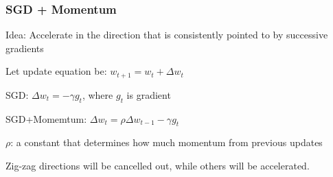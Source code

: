 \begin{frame}
\frametitle{SGD + Momentum}
\bi
\item Idea: Accelerate in the direction that is consistently pointed to by successive gradients
\pause
\item Let update equation be: $w_{t+1} = w_t + \Delta w_t$
	\bi
	\item SGD: $\Delta w_t = -\gamma g_t$, where $g_t$ is gradient
	\pause
	\item SGD+Momemtum: $\Delta w_t = \rho \Delta w_{t-1} - \gamma g_t$ \pause
	\ei
\item $\rho$: a constant that determines how much momentum from previous updates \pause
\item Zig-zag directions will be cancelled out, while others will be accelerated.
\ei
{}
\end{frame}


